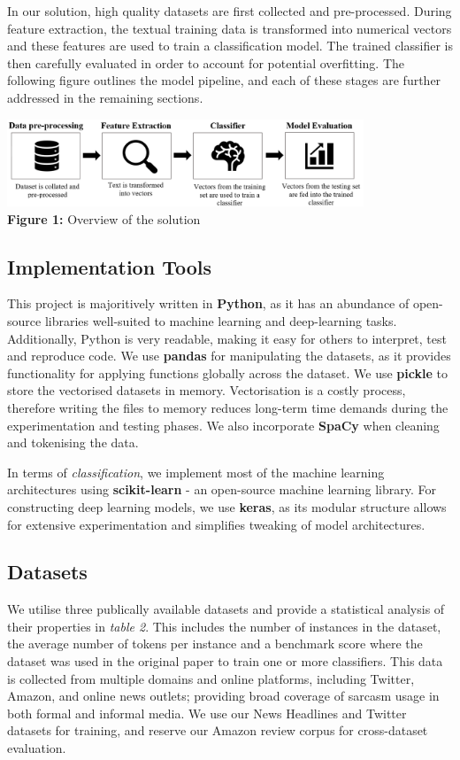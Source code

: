 \documentclass[12pt,a4paper]{article}
\begin{document}
In our solution, high quality datasets are first collected and pre-processed. During feature extraction, the textual training data is transformed into numerical vectors and these features are used to train a classification model. The trained classifier is then carefully evaluated in order to account for potential overfitting. The following figure outlines the model pipeline, and each of these stages are further addressed in the remaining sections.

\begin{center}
	\includegraphics[width=0.8\textwidth]{Images/modelpipeline2.png}
	\label{Model Pipeline}\\
	\textbf{Figure 1:} Overview of the solution
\end{center}

\subsection{Implementation Tools}
\noindent This project is majoritively written in \textbf{Python}, as it has an abundance of open-source libraries well-suited to machine learning and deep-learning tasks. Additionally, Python is very readable, making it easy for others to interpret, test and reproduce code. We use \textbf{pandas} for manipulating the datasets, as it provides functionality for applying functions globally across the dataset. We use \textbf{pickle} to store the vectorised datasets in memory. Vectorisation is a costly process, therefore writing the files to memory reduces long-term time demands during the experimentation and testing phases. We also  incorporate \textbf{SpaCy} when cleaning and tokenising the data.

In terms of \textit{classification}, we implement most of the machine learning architectures using \textbf{scikit-learn} - an open-source machine learning library. For constructing deep learning models, we use \textbf{keras}, as its modular structure allows for extensive experimentation and simplifies tweaking of model architectures.

\subsection{Datasets}
\vspace{-4.2pt}\noindent We utilise three publically available datasets and provide a statistical analysis of their properties in \textit{table 2}. This includes the number of instances in the dataset, the average number of tokens per instance and a benchmark score where the dataset was used in the original paper to train one or more classifiers. This data is collected from multiple domains and online platforms, including Twitter, Amazon, and online news outlets; providing broad coverage of sarcasm usage in both formal and informal media. We use our News Headlines and Twitter datasets for training, and reserve our Amazon review corpus for cross-dataset evaluation.
\end{document}
